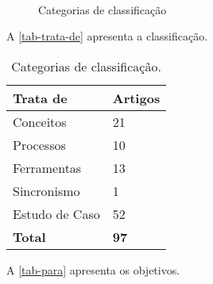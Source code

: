 \documentclass[
article,			%
11pt,				%
oneside,			%
a4paper,			%
english,			%
brazil,				%
sumario=tradicional
]{abntex2}
\begin{document}
  \begin{figure}[htb]
    \caption{\label{diag-trata-de-para}Categorias de classificação}
    \begin{center}
       \\
    \end{center}
  \end{figure}

  A \autoref{tab-trata-de} apresenta a classificação.

  \begin{table}[htb]
    \ABNTEXfontereduzida
    \caption[Categorias de classificação]{Categorias de classificação.}
    \label{tab-trata-de}
    \begin{center}
      \begin{tabular}{p{3.0cm}|p{2.0cm}}
        \textbf{Trata de} & \textbf{Artigos} \\
        \hline
        Conceitos & 21 \\
        \hline
        Processos & 10 \\
        \hline
        Ferramentas & 13\\
        \hline
        Sincronismo & 1\\
        \hline
        Estudo de Caso & 52\\
        \hline
        \textbf{Total} & \textbf{97} \\
      \end{tabular}
    \end{center}
  \end{table}

  A \autoref{tab-para} apresenta os objetivos.
\end{document}
